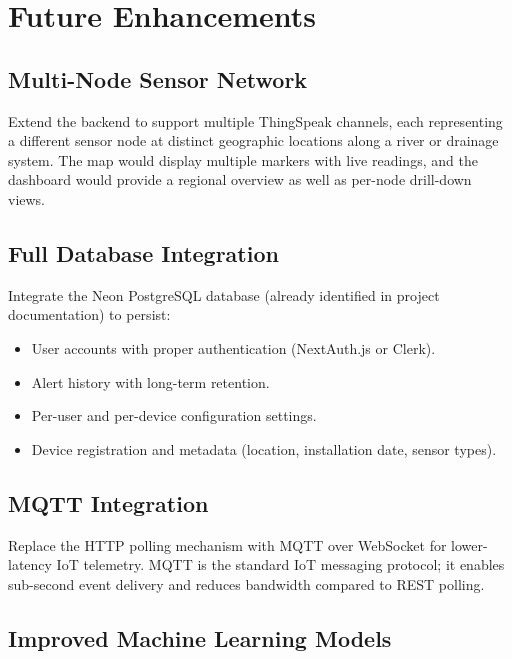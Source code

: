 ﻿%
\chapter{Future Enhancements}

\section{Multi-Node Sensor Network}

Extend the backend to support multiple ThingSpeak channels, each representing a different sensor node at distinct geographic locations along a river or drainage system. The map would display multiple markers with live readings, and the dashboard would provide a regional overview as well as per-node drill-down views.

\section{Full Database Integration}

Integrate the Neon PostgreSQL database (already identified in project documentation) to persist:
\begin{itemize}[leftmargin=1.5em]
  \item User accounts with proper authentication (NextAuth.js or Clerk).
  \item Alert history with long-term retention.
  \item Per-user and per-device configuration settings.
  \item Device registration and metadata (location, installation date, sensor types).
\end{itemize}

\section{MQTT Integration}

Replace the HTTP polling mechanism with MQTT over WebSocket for lower-latency IoT telemetry. MQTT is the standard IoT messaging protocol; it enables sub-second event delivery and reduces bandwidth compared to REST polling.

\section{Improved Machine Learning Models}

